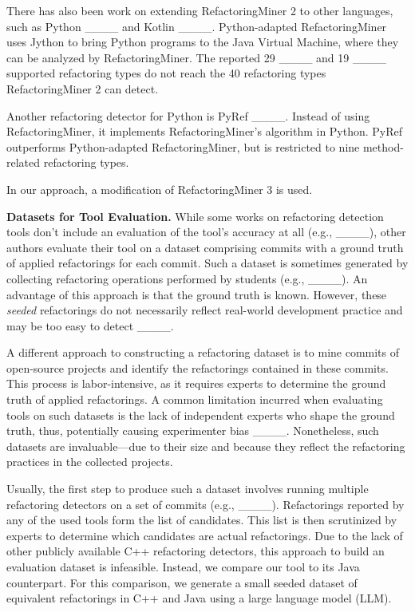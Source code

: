 There has also been work on extending RefactoringMiner 2 to other languages, such as Python ____ and Kotlin ____. %
Python-adapted RefactoringMiner uses Jython to bring Python programs to the Java Virtual Machine, where they can be analyzed by RefactoringMiner. The reported 29 ____ %
and 19 ____ supported refactoring types do not reach the 40 refactoring types RefactoringMiner 2 can detect.

Another refactoring detector for Python is PyRef ____. Instead of using RefactoringMiner, it implements RefactoringMiner's algorithm in Python. PyRef outperforms Python-adapted RefactoringMiner, but is restricted to nine method-related refactoring types.

In our approach, a modification of RefactoringMiner 3 is used.

\noindent\textbf{Datasets for Tool Evaluation.} While some works on refactoring detection tools don't include an evaluation of the tool's accuracy at all (e.g., ____), other authors evaluate their tool on a dataset comprising commits with a ground truth of applied refactorings for each commit. Such a dataset is sometimes generated by collecting refactoring operations performed by students (e.g., ____). An advantage of this approach is that the ground truth is known. However, these \emph{seeded} refactorings do not necessarily reflect real-world development practice and may be too easy to detect ____.

A different approach to constructing a refactoring dataset is to mine commits of open-source projects and identify the refactorings contained in these commits. This process is labor-intensive, as it requires experts to determine the ground truth of applied refactorings. %
A common limitation incurred when evaluating tools on such datasets is the lack of independent experts who shape the ground truth, thus, potentially causing experimenter bias ____. Nonetheless, such datasets are invaluable---due to their size and because they reflect the refactoring practices in the collected projects.

Usually, the first step to produce such a dataset involves running multiple refactoring detectors on a set of commits (e.g., ____). Refactorings reported by any of the used tools form the list of candidates. This list is then scrutinized by experts to determine which candidates are actual refactorings. Due to the lack of other publicly available C++ refactoring detectors, this approach to build an evaluation dataset is infeasible. Instead, we compare our tool to its Java counterpart. For this comparison, we generate a small seeded dataset of equivalent refactorings in C++ and Java using a large language model (LLM).



